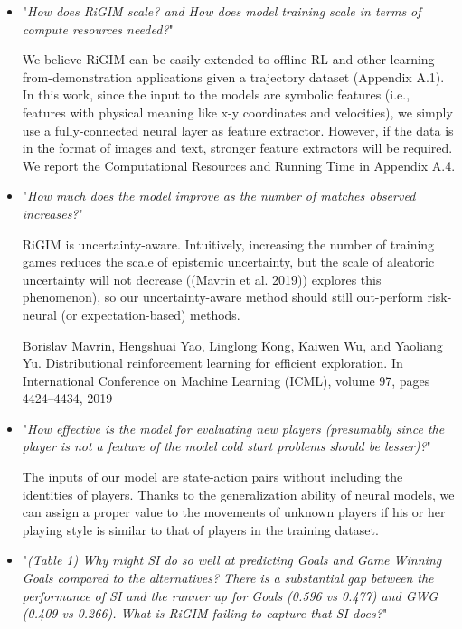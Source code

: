\documentclass[letterpaper]{article} %
\begin{document}
\begin{itemize}
    \item "{\it How does RiGIM scale? and How does model training scale in terms of compute resources needed?}"
    
    We believe RiGIM can be easily extended to offline RL and other learning-from-demonstration applications given a trajectory dataset (Appendix A.1). In this work, since the input to the models are symbolic features (i.e., features with physical meaning like x-y coordinates and velocities), we simply use a fully-connected neural layer as feature extractor. However, if the data is in the format of images and text, stronger feature extractors will be required. We report the Computational Resources and Running Time in Appendix A.4.
    \medskip
    
    \item "{\it How much does the model improve as the number of matches observed increases?}"
    
    RiGIM is uncertainty-aware. Intuitively, increasing the number of training games reduces the scale of epistemic uncertainty, but the scale of aleatoric uncertainty will not decrease ((Mavrin et al. 2019)) explores this phenomenon), so our uncertainty-aware method should still out-perform risk-neural (or expectation-based) methods.
    \smallskip
    
    Borislav Mavrin, Hengshuai Yao, Linglong Kong, Kaiwen Wu, and Yaoliang Yu. Distributional reinforcement learning for efficient exploration. In International Conference on Machine Learning (ICML), volume 97, pages 4424–4434, 2019
    \medskip
    
    \item "{\it How effective is the model for evaluating new players (presumably since the player is not a feature of the model cold start problems should be lesser)?}"
    
    The inputs of our model are state-action pairs without including the identities of players. Thanks to the generalization ability of neural models, we can assign a proper value to the movements of unknown players if his or her playing style is similar to that of players in the training dataset.
    \medskip
    
    \item "{\it  (Table 1) Why might SI do so well at predicting Goals and Game Winning Goals compared to the alternatives? There is a substantial gap between the performance of SI and the runner up for Goals (0.596 vs 0.477) and GWG (0.409 vs 0.266). What is RiGIM failing to capture that SI does?}"
    

\end{itemize}
\end{document}
